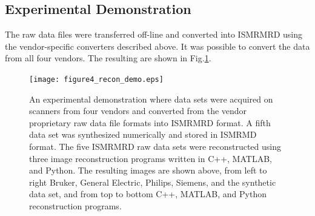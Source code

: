 \documentclass[12pt, draft]{article}
\begin{document}
\subsection*{Experimental Demonstration}
The raw data files were transferred off-line and converted into ISMRMRD using the vendor-specific converters described above. It was possible to convert the data from all four vendors. The resulting are shown in Fig.\ref{fig:demo}.

\begin{figure}
\begin{center}
\texttt{[image: figure4\_recon\_demo.eps]}
\end{center}
\caption{An experimental demonstration where data sets were acquired on scanners from four vendors and converted from the vendor proprietary raw data file formats into ISMRMRD format.  A fifth data set was synthesized numerically and stored in ISMRMD format.  The five ISMRMRD raw data sets were reconstructed using three image reconstruction programs written in C++, MATLAB, and Python.  The resulting images are shown above, from left to right Bruker, General Electric, Philips, Siemens, and the synthetic data set,  and from top to bottom C++, MATLAB, and Python reconstruction programs.}
\label{fig:demo}
\end{figure}
\end{document}

